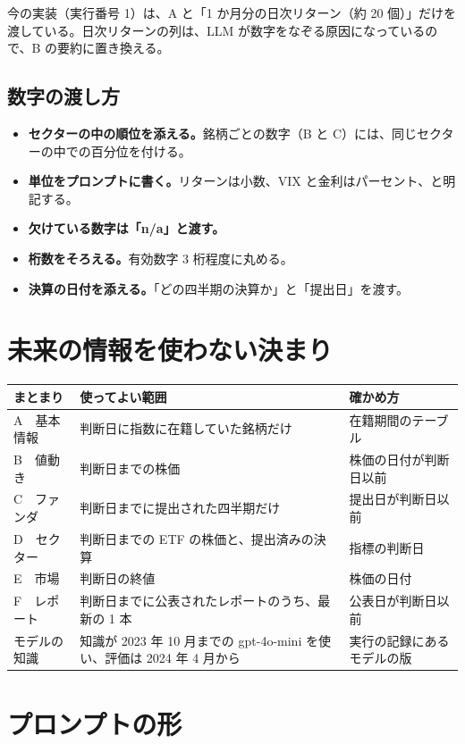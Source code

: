 \documentclass[xelatex,ja=standard,jafont=hiragino-pron,a4paper,10pt]{bxjsreport}
\begin{document}
今の実装（実行番号 1）は、A と「1 か月分の日次リターン（約 20 個）」だけを渡している。日次リターンの列は、LLM が数字をなぞる原因になっているので、B の要約に置き換える。

\subsection{数字の渡し方}

\begin{itemize}
\item \textbf{セクターの中の順位を添える。}銘柄ごとの数字（B と C）には、同じセクターの中での百分位を付ける。
\item \textbf{単位をプロンプトに書く。}リターンは小数、VIX と金利はパーセント、と明記する。
\item \textbf{欠けている数字は「n/a」と渡す。}
\item \textbf{桁数をそろえる。}有効数字 3 桁程度に丸める。
\item \textbf{決算の日付を添える。}「どの四半期の決算か」と「提出日」を渡す。
\end{itemize}

\section{未来の情報を使わない決まり}

\begin{longtable}{p{3.00cm}p{6.20cm}p{5.20cm}}
\toprule
\textbf{まとまり} & \textbf{使ってよい範囲} & \textbf{確かめ方} \\
\midrule
\endfirsthead
\bottomrule
\endfoot
A　基本情報 & 判断日に指数に在籍していた銘柄だけ & 在籍期間のテーブル \\
B　値動き & 判断日までの株価 & 株価の日付が判断日以前 \\
C　ファンダ & 判断日までに提出された四半期だけ & 提出日が判断日以前 \\
D　セクター & 判断日までの ETF の株価と、提出済みの決算 & 指標の判断日 \\
E　市場 & 判断日の終値 & 株価の日付 \\
F　レポート & 判断日までに公表されたレポートのうち、最新の 1 本 & 公表日が判断日以前 \\
モデルの知識 & 知識が 2023 年 10 月までの gpt-4o-mini を使い、評価は 2024 年 4 月から & 実行の記録にあるモデルの版 \\
\end{longtable}

\section{プロンプトの形}
\end{document}
